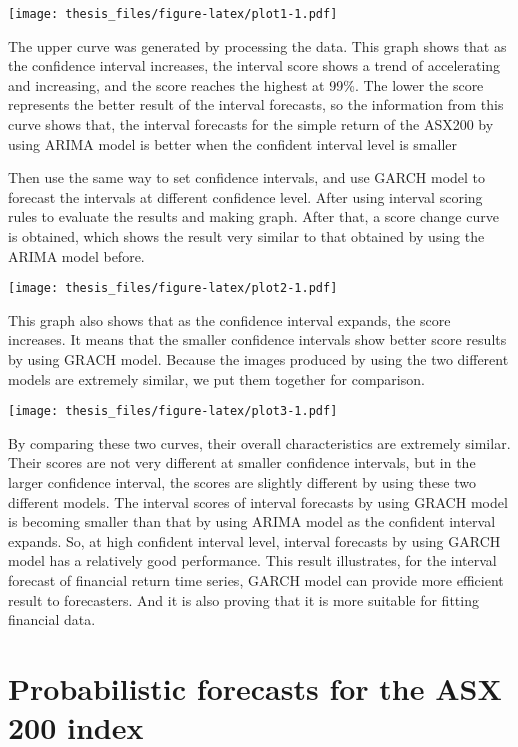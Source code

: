 \documentclass{monashthesis}
\theoremstyle{definition}
\theoremstyle{definition}
\theoremstyle{definition}
\theoremstyle{remark}
\begin{document}
\texttt{[image: thesis\_files/figure-latex/plot1-1.pdf]}

The upper curve was generated by processing the data. This graph shows
that as the confidence interval increases, the interval score shows a
trend of accelerating and increasing, and the score reaches the highest
at 99\%. The lower the score represents the better result of the
interval forecasts, so the information from this curve shows that, the
interval forecasts for the simple return of the ASX200 by using ARIMA
model is better when the confident interval level is smaller

Then use the same way to set confidence intervals, and use GARCH model
to forecast the intervals at different confidence level. After using
interval scoring rules to evaluate the results and making graph. After
that, a score change curve is obtained, which shows the result very
similar to that obtained by using the ARIMA model before.

\texttt{[image: thesis\_files/figure-latex/plot2-1.pdf]}

This graph also shows that as the confidence interval expands, the score
increases. It means that the smaller confidence intervals show better
score results by using GRACH model. Because the images produced by using
the two different models are extremely similar, we put them together for
comparison.

\texttt{[image: thesis\_files/figure-latex/plot3-1.pdf]}

By comparing these two curves, their overall characteristics are
extremely similar. Their scores are not very different at smaller
confidence intervals, but in the larger confidence interval, the scores
are slightly different by using these two different models. The interval
scores of interval forecasts by using GRACH model is becoming smaller
than that by using ARIMA model as the confident interval expands. So, at
high confident interval level, interval forecasts by using GARCH model
has a relatively good performance. This result illustrates, for the
interval forecast of financial return time series, GARCH model can
provide more efficient result to forecasters. And it is also proving
that it is more suitable for fitting financial data.

\section{Probabilistic forecasts for the ASX 200
index}\label{probabilistic-forecasts-for-the-asx-200-index}
\end{document}
